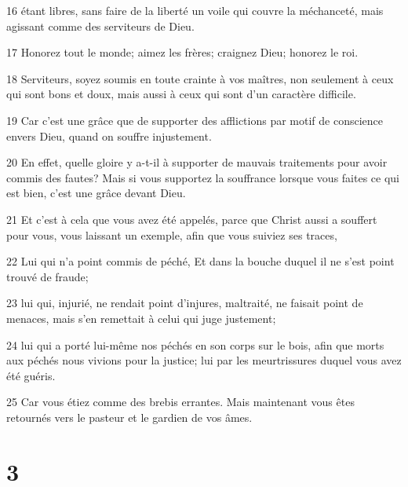 \par 16 étant libres, sans faire de la liberté un voile qui couvre la méchanceté, mais agissant comme des serviteurs de Dieu.
\par 17 Honorez tout le monde; aimez les frères; craignez Dieu; honorez le roi.
\par 18 Serviteurs, soyez soumis en toute crainte à vos maîtres, non seulement à ceux qui sont bons et doux, mais aussi à ceux qui sont d'un caractère difficile.
\par 19 Car c'est une grâce que de supporter des afflictions par motif de conscience envers Dieu, quand on souffre injustement.
\par 20 En effet, quelle gloire y a-t-il à supporter de mauvais traitements pour avoir commis des fautes? Mais si vous supportez la souffrance lorsque vous faites ce qui est bien, c'est une grâce devant Dieu.
\par 21 Et c'est à cela que vous avez été appelés, parce que Christ aussi a souffert pour vous, vous laissant un exemple, afin que vous suiviez ses traces,
\par 22 Lui qui n'a point commis de péché, Et dans la bouche duquel il ne s'est point trouvé de fraude;
\par 23 lui qui, injurié, ne rendait point d'injures, maltraité, ne faisait point de menaces, mais s'en remettait à celui qui juge justement;
\par 24 lui qui a porté lui-même nos péchés en son corps sur le bois, afin que morts aux péchés nous vivions pour la justice; lui par les meurtrissures duquel vous avez été guéris.
\par 25 Car vous étiez comme des brebis errantes. Mais maintenant vous êtes retournés vers le pasteur et le gardien de vos âmes.

\chapter{3}

